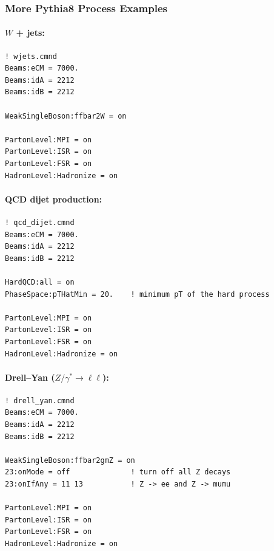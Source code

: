 \documentclass[11pt,a4paper]{article}
\begin{document}
\subsubsection{More Pythia8 Process Examples}

\paragraph{$W$ + jets:}

\begin{lstlisting}[style=cmnd,caption={Pythia8 steering card for $W$ + jets.}]
! wjets.cmnd
Beams:eCM = 7000.
Beams:idA = 2212
Beams:idB = 2212

WeakSingleBoson:ffbar2W = on

PartonLevel:MPI = on
PartonLevel:ISR = on
PartonLevel:FSR = on
HadronLevel:Hadronize = on
\end{lstlisting}

\paragraph{QCD dijet production:}

\begin{lstlisting}[style=cmnd,caption={Pythia8 steering card for QCD dijet production.}]
! qcd_dijet.cmnd
Beams:eCM = 7000.
Beams:idA = 2212
Beams:idB = 2212

HardQCD:all = on
PhaseSpace:pTHatMin = 20.    ! minimum pT of the hard process

PartonLevel:MPI = on
PartonLevel:ISR = on
PartonLevel:FSR = on
HadronLevel:Hadronize = on
\end{lstlisting}

\paragraph{Drell--Yan ($Z/\gamma^* \to \ell\ell$):}

\begin{lstlisting}[style=cmnd,caption={Pythia8 steering card for Drell--Yan production.}]
! drell_yan.cmnd
Beams:eCM = 7000.
Beams:idA = 2212
Beams:idB = 2212

WeakSingleBoson:ffbar2gmZ = on
23:onMode = off              ! turn off all Z decays
23:onIfAny = 11 13           ! Z -> ee and Z -> mumu

PartonLevel:MPI = on
PartonLevel:ISR = on
PartonLevel:FSR = on
HadronLevel:Hadronize = on
\end{lstlisting}

\end{document}
